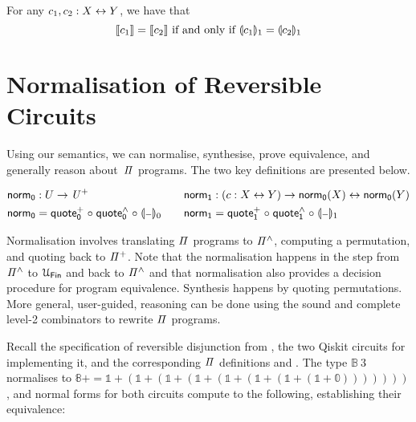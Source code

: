 \begin{theorem}
  For any $c_1, c_2 : X \mathrel{\leftrightarrow} Y$, we have that
  \[
    \llbracket c_1\rrbracket = \llbracket c_2\rrbracket \text{ if and only if } \llparenthesis c_1\rrparenthesis_{1} = \llparenthesis c_2\rrparenthesis_{1}
  \]
\end{theorem}

\section{Normalisation of Reversible Circuits}
\label{sec:applications}

Using our semantics, we can normalise, synthesise, prove equivalence, and generally reason about~$\mathit{\Pi}$ programs. The
two key definitions are presented below.

\begin{definition}
  \begin{gather*}
    \begin{aligned}
      \normt_{0} & : U \to \UPlus                                            \\
      \normt_{0} & = \quotep_{0} \comp \quoteh_{0} \comp \gdenot{\blank}_{0}
    \end{aligned}
    \qquad
    \begin{aligned}
      \normt_{1} & : (c : X \iso Y) \to \normt_{0}(X) \iso \normt_{0}(Y)     \\
      \normt_{1} & = \quotep_{1} \comp \quoteh_{1} \comp \gdenot{\blank}_{1}
    \end{aligned}
  \end{gather*}
\end{definition}

\noindent Normalisation involves translating $\mathit{\Pi}$ programs to $\mathit{{\Pi}^{\wedge}}$, computing a permutation, and quoting
back to $\mathit{{\Pi}^{+}}$. Note that the normalisation happens in the step from $\mathit{{\Pi}^{\wedge}}$ to $\UFin$ and back to
$\mathit{{\Pi}^{\wedge}}$ and that normalisation also provides a decision procedure for program equivalence. Synthesis happens by
quoting permutations. More general, user-guided, reasoning can be done using the sound and complete level-2
combinators to rewrite $\mathit{\Pi}$ programs.

Recall the specification of reversible disjunction from , the two Qiskit circuits for implementing
it, and the corresponding $\mathit{\Pi}$ definitions  and . The type $\mathbb{B}\ 3$
normalises to $\mathbb{8}+ = \mathbb{1} + (\mathbb{1} + (\mathbb{1} + (\mathbb{1} + (\mathbb{1} + (\mathbb{1} + (\mathbb{1} +
(\mathbb{1} + \mathbb{0})))))))$, and normal forms for both circuits compute to the following, establishing their equivalence:

